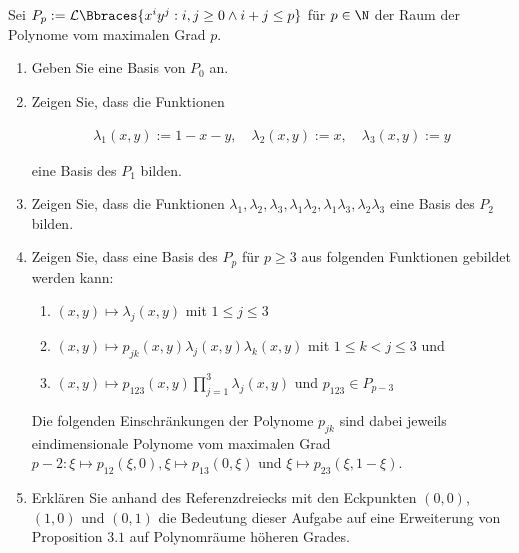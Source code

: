 
\begin{exercise}

Sei $P_p:= \mathcal{L} \Bbraces{x^i y^j: i, j \geq 0 \land i+j \leq p}$ für $p \in \N$ der Raum der Polynome vom maximalen Grad $p$.

\begin{enumerate}[label = \textbf{\alph*)}]

  \item Geben Sie eine Basis von $P_0$ an.

  \item Zeigen Sie, dass die Funktionen

  \begin{align}
    \lambda_1(x, y) := 1-x-y,
    \quad
    \lambda_2(x, y) := x,
    \quad
    \lambda_3(x, y) := y
  \end{align}

  eine Basis des $P_1$ bilden.

  \item Zeigen Sie, dass die Funktionen $\lambda_1, \lambda_2, \lambda_3, \lambda_1 \lambda_2, \lambda_1 \lambda_3, \lambda_2\lambda_3$ eine Basis des $P_2$ bilden.

  \item Zeigen Sie, dass eine Basis des $P_p$ für $p \geq 3$ aus folgenden Funktionen gebildet werden kann:

  \begin{enumerate}[label = (\roman*)]
    \item $(x, y) \mapsto \lambda_j(x, y)$ mit $1 \leq j \leq 3$
    \item $(x, y) \mapsto p_{jk}(x, y)\lambda_j(x, y)\lambda_k(x, y)$ mit $1 \leq k < j \leq 3$ und
    \item $(x, y) \mapsto p_{123}(x, y) \prod_{j=1}^3 \lambda_j(x, y)$ und $p_{123} \in P_{p-3}$
  \end{enumerate}

  Die folgenden Einschränkungen der Polynome $p_{jk}$ sind dabei jeweils eindimensionale Polynome vom maximalen Grad $p-2: \xi \mapsto p_{12}(\xi, 0), \xi \mapsto p_{13}(0, \xi)$ und $\xi \mapsto p_{23}(\xi, 1-\xi)$.

  \item Erklären Sie anhand des Referenzdreiecks mit den Eckpunkten $(0, 0)$, $(1, 0)$ und $(0, 1)$ die Bedeutung dieser Aufgabe auf eine Erweiterung von Proposition $3.1$ auf Polynomräume höheren Grades.

\end{enumerate}

\end{exercise}


